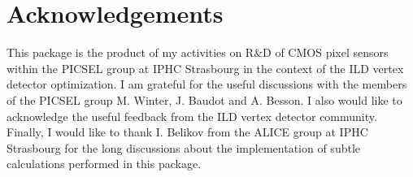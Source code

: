 \section{Acknowledgements}
\label{sec:acknowledgements}

This package is the product of my activities on R\&D of CMOS pixel sensors within the PICSEL group at IPHC Strasbourg in the context of the ILD vertex detector
optimization. I am grateful for the useful discussions with the members of the PICSEL group M. Winter, J. Baudot and A. Besson. I also would like to acknowledge the 
useful feedback from the ILD vertex detector community. Finally, I would like to thank I. Belikov from the ALICE group at IPHC Strasbourg for the long discussions 
about the implementation of subtle calculations performed in this package.


